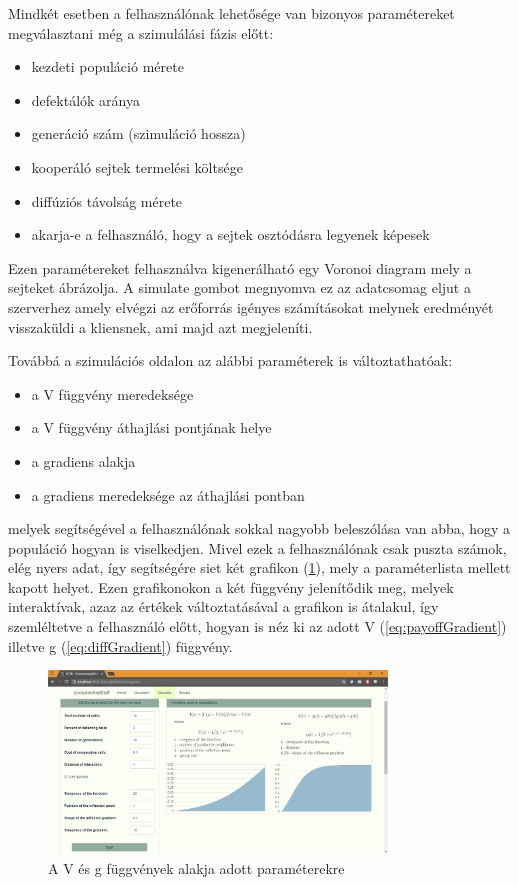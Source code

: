 Mindkét esetben a felhasználónak lehetősége van bizonyos paramétereket megválasztani még a szimulálási fázis előtt:
\begin{itemize}[noitemsep]
	\item kezdeti populáció mérete
	\item defektálók aránya 
	\item generáció szám (szimuláció hossza)
	\item kooperáló sejtek termelési költsége 
	\item diffúziós távolság mérete
	\item akarja-e a felhasználó, hogy a sejtek osztódásra legyenek képesek
\end{itemize}
Ezen paramétereket felhasználva kigenerálható egy Voronoi diagram mely a sejteket ábrázolja. A simulate gombot megnyomva ez az adatcsomag eljut a szerverhez amely elvégzi az erőforrás igényes számításokat melynek eredményét visszaküldi a kliensnek, ami majd azt megjeleníti.

Továbbá a szimulációs oldalon az alábbi paraméterek is változtathatóak:
\begin{itemize}[noitemsep]
	\item a V függvény meredeksége
	\item a V függvény áthajlási pontjának helye
	\item a gradiens alakja
	\item a gradiens meredeksége az áthajlási pontban
\end{itemize}
melyek segítségével a felhasználónak sokkal nagyobb beleszólása van abba, hogy a populáció hogyan is viselkedjen. Mivel ezek a felhasználónak csak puszta számok, elég nyers adat, így segítségére siet két grafikon (\ref{fig:SimulationFunctionDiagrams}), mely a paraméterlista mellett kapott helyet. Ezen grafikonokon a két függvény jelenítődik meg, melyek interaktívak, azaz az értékek változtatásával a grafikon is átalakul, így szemléltetve a felhasználó előtt, hogyan is néz ki az adott V (\ref{eq:payoffGradient}) illetve g (\ref{eq:diffGradient}) függvény.

\begin{figure}[ht!]
	\centering
	\includegraphics[width=90mm]{images/SimulationFunctionDiagrams}
	\caption{A V és g függvények alakja adott paraméterekre}
	\label{fig:SimulationFunctionDiagrams}
\end{figure}


